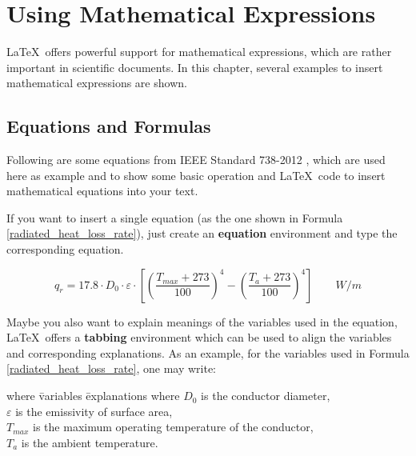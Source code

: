\chapter{Using Mathematical Expressions}

\graphicspath{ {graphics/Chapter2/} }

\LaTeX~offers powerful support for mathematical expressions, which are rather important in scientific documents. In this chapter, several examples to insert mathematical expressions are shown.

\section{Equations and Formulas}
	
	Following are some equations from IEEE Standard 738-2012 \cite{IEEEPower&EnergySociety.2013}, which are used here as example and to show some basic operation and \LaTeX~code to insert mathematical equations into your text. 
	
	If you want to insert a single equation (as the one shown in Formula \ref{radiated_heat_loss_rate}), just create an {\color{blue}\textbf{equation}} environment and type the corresponding equation.
	
	\begin{equation}
		q_r = 17.8 {\cdot} D_0 {\cdot} {\varepsilon} {\cdot}\left[
		\left( \frac{T_{max}{+}273}{100} \right)^4 - \left( \frac{T_a{+}273}{100} \right)^4
		\right] \qquad W/m
		\label{radiated_heat_loss_rate}
	\end{equation}
	
	Maybe you also want to explain meanings of the variables used in the equation, \LaTeX~offers a {\color{blue}\textbf{tabbing}} environment which can be used to align the variables and corresponding explanations. As an example, for the variables used in Formula \ref{radiated_heat_loss_rate}, one may write:
	
	\begin{tabbing}
		where \hspace{0.3cm} \= variables  \= explanations \kill
		where \> {$D_0$} \> is the conductor diameter, \\
		\> {$\varepsilon$} \> is the emissivity of surface area, \\
		\> {$T_{max}$} \> is the maximum operating temperature of the conductor, \\
		\> {$T_a$} \> is the ambient temperature.
	\end{tabbing}
	
